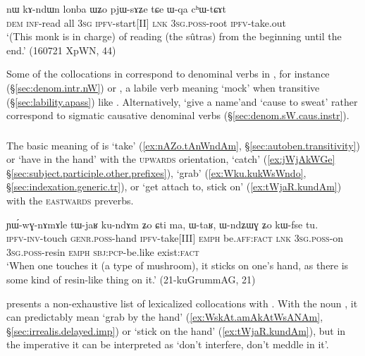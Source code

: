 \begin{exe}
\ex \label{ex:Wqa.chWtCAt}
\gll nɯ kɤ-ndɯn lonba ɯʑo pjɯ-sɤʑe tɕe ɯ-qa cʰɯ-tɕɤt \\
\textsc{dem} \textsc{inf}-read all \textsc{3sg} \textsc{ipfv}-start[II] \textsc{lnk} \textsc{3sg}.\textsc{poss}-root \textsc{ipfv}-take.out \\
\glt `(This monk is in charge) of reading (the sûtras) from the beginning until the end.' (160721 XpWN, 44)
\end{exe} 

Some of the collocations in  correspond to denominal verbs in , for instance  (§\ref{sec:denom.intr.nW}) or , a labile verb meaning `mock' when transitive (§\ref{sec:lability.apass}) like . Alternatively,  `give a name'and  `cause to sweat' rather correspond to sigmatic causative denominal verbs (§\ref{sec:denom.sW.caus.instr}).


\subsubsection{ } \label{sec:ndo.lv}
The basic meaning of  is `take' (\ref{ex:nAZo.tAnWndAm}, §\ref{sec:autoben.transitivity}) or `have in the hand' with the \textsc{upwards} orientation, `catch' (\ref{ex:jWjAkWGe} §\ref{sec:subject.participle.other.prefixes}), `grab' (\ref{ex:Wku.kukWsWndo}, §\ref{sec:indexation.generic.tr}), or  `get attach to, stick on' (\ref{ex:tWjaR.kundAm}) with the \textsc{eastwards} preverbs.  
  
\begin{exe}
\ex \label{ex:tWjaR.kundAm}
\gll ɲɯ́-wɣ-nɤmɤle tɯ-jaʁ ku-ndɤm ʑo ɕti ma, ɯ-taʁ, ɯ-ndʑɯɣ ʑo kɯ-fse tu. \\
\textsc{ipfv}-\textsc{inv}-touch \textsc{genr}.\textsc{poss}-hand \textsc{ipfv}-take[III] \textsc{emph} be.\textsc{aff}:\textsc{fact} \textsc{lnk} \textsc{3sg}.\textsc{poss}-on \textsc{3sg}.\textsc{poss}-resin \textsc{emph} \textsc{sbj}:\textsc{pcp}-be.like exist:\textsc{fact} \\
\glt `When one touches it (a type of mushroom), it sticks on one's hand, as there is some kind of resin-like thing on it.' (21-kuGrummAG, 21)
\end{exe}

 presents a non-exhaustive list of lexicalized collocations with . With the noun , it can predictably mean `grab by the hand' (\ref{ex:WskAt.amAkAtWsANAm}, §\ref{sec:irrealis.delayed.imp}) or `stick on the hand' (\ref{ex:tWjaR.kundAm}), but in the imperative it can be interpreted as `don't interfere, don't meddle in it'.


